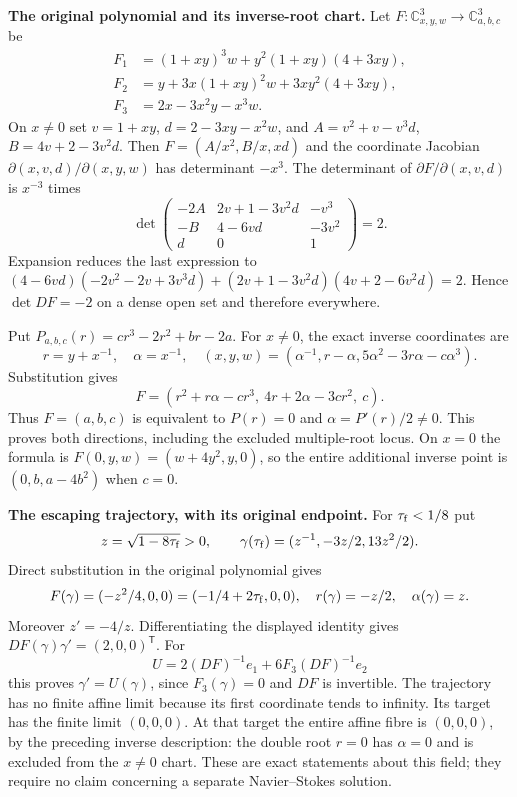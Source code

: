 \EH\textbf{The original polynomial and its inverse-root chart.}
Let $F:\mathbb C^3_{x,y,w}\to\mathbb C^3_{a,b,c}$ be
\begin{align*}
 F_1&=(1+xy)^3w+y^2(1+xy)(4+3xy),\\
 F_2&=y+3x(1+xy)^2w+3xy^2(4+3xy),\\
 F_3&=2x-3x^2y-x^3w.
\end{align*}
On $x\ne0$ set $v=1+xy$, $d=2-3xy-x^2w$, and
$A=v^2+v-v^3d$, $B=4v+2-3v^2d$. Then
$F=(A/x^2,B/x,xd)$ and the coordinate Jacobian
$\partial(x,v,d)/\partial(x,y,w)$ has determinant $-x^3$.
The determinant of $\partial F/\partial(x,v,d)$ is $x^{-3}$ times
\[
\det\begin{pmatrix}-2A&2v+1-3v^2d&-v^3\\
-B&4-6vd&-3v^2\\d&0&1\end{pmatrix}=2.
\]
Expansion reduces the last expression to
$(4-6vd)(-2v^2-2v+3v^3d)+(2v+1-3v^2d)(4v+2-6v^2d)=2$.
Hence $\det DF=-2$ on a dense open set and therefore everywhere.

Put $P_{a,b,c}(r)=cr^3-2r^2+br-2a$. For $x\ne0$, the exact inverse
coordinates are
\[
 r=y+x^{-1},\quad \alpha=x^{-1},\quad
 (x,y,w)=(\alpha^{-1},r-\alpha,5\alpha^2-3r\alpha-c\alpha^3).
\]
Substitution gives
\[
F=(r^2+r\alpha-cr^3,\ 4r+2\alpha-3cr^2,\ c).
\]
Thus $F=(a,b,c)$ is equivalent to $P(r)=0$ and
$\alpha=P'(r)/2\ne0$. This proves both directions, including the
excluded multiple-root locus. On $x=0$ the formula is
$F(0,y,w)=(w+4y^2,y,0)$, so the entire additional inverse point is
$(0,b,a-4b^2)$ when $c=0$.

\EH\textbf{The escaping trajectory, with its original endpoint.}
For $\tau_{\rm f}<1/8$ put
\[
 z=\sqrt{1-8\tau_{\rm f}}>0,\qquad
 \gamma(\tau_{\rm f})=(z^{-1},-3z/2,13z^2/2).
\]
Direct substitution in the original polynomial gives
\[
 F(\gamma)=(-z^2/4,0,0)=(-1/4+2\tau_{\rm f},0,0),\quad
 r(\gamma)=-z/2,\quad \alpha(\gamma)=z.
\]
Moreover $z'=-4/z$. Differentiating the displayed identity gives
$DF(\gamma)\gamma'=(2,0,0)^{\mathsf T}$. For
\[
 U=2(DF)^{-1}e_1+6F_3(DF)^{-1}e_2
\]
this proves $\gamma'=U(\gamma)$, since $F_3(\gamma)=0$ and $DF$ is
invertible. The trajectory has no finite affine limit because its first
coordinate tends to infinity. Its target has the finite limit $(0,0,0)$.
At that target the entire affine fibre is $(0,0,0)$, by the preceding
inverse description: the double root $r=0$ has $\alpha=0$ and is excluded
from the $x\ne0$ chart. These are exact statements about this field;
they require no claim concerning a separate Navier--Stokes solution.

